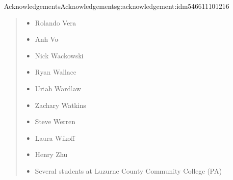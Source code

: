 \documentclass[oneside,10pt,]{book}
\numberwithin{equation}{section}
\begin{document}
\begin{acknowledgement}{Acknowledgements}{}{Acknowledgements}{}{}{g:acknowledgement:idm546611101216}
\begin{quote}
\begin{multicols}{2}
\begin{itemize}[label=\textbullet]
\item{}Rolando Vera%
\item{}Anh Vo%
\item{}Nick Wackowski%
\item{}Ryan Wallace%
\item{}Uriah Wardlaw%
\item{}Zachary Watkins%
\item{}Steve Werren%
\item{}Laura Wikoff%
\item{}Henry Zhu%
\item{}Several students at Luzurne County Community College (PA)%
\end{itemize}
\end{multicols}
%
\end{quote}
\end{acknowledgement}
%
%
\typeout{************************************************}
\typeout{************************************************}
%
\end{document}
